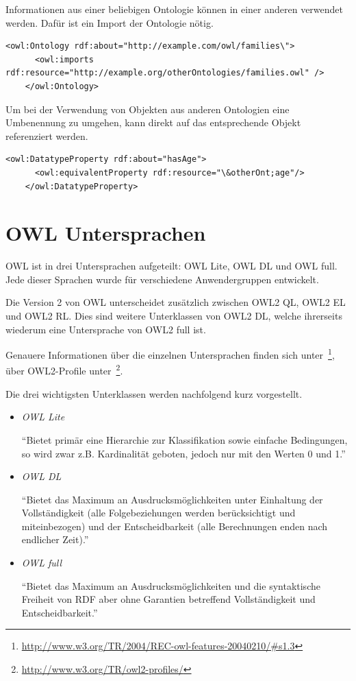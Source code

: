 Informationen aus einer beliebigen Ontologie können in einer anderen verwendet werden. Dafür ist ein Import der Ontologie nötig.

\begin{lstlisting}[caption={Beispiel eines Importes einer Ontologie}]
    <owl:Ontology rdf:about="http://example.com/owl/families\">
      <owl:imports rdf:resource="http://example.org/otherOntologies/families.owl" />
    </owl:Ontology>
\end{lstlisting}


Um bei der Verwendung von Objekten aus anderen Ontologien eine Umbenennung zu umgehen, kann direkt auf das entsprechende Objekt referenziert werden.

\begin{lstlisting}[caption={Beispiel einer Referenzierung auf ein Objekt einer externen Ontologie}]
    <owl:DatatypeProperty rdf:about="hasAge">
      <owl:equivalentProperty rdf:resource="\&otherOnt;age"/>
    </owl:DatatypeProperty>
\end{lstlisting}

\section{OWL Untersprachen}
\label{sec:owl_owl_Untersprachen}
OWL ist in drei Untersprachen aufgeteilt: OWL Lite, OWL DL und OWL full. Jede dieser Sprachen wurde für verschiedene Anwendergruppen entwickelt.

Die Version 2 von OWL unterscheidet zusätzlich zwischen OWL2 QL, OWL2 EL und OWL2 RL. Dies sind weitere Unterklassen von OWL2 DL, welche ihrerseits wiederum eine Untersprache von OWL2 full ist.

Genauere Informationen über die einzelnen Untersprachen finden sich unter~\footnote{\url{http://www.w3.org/TR/2004/REC-owl-features-20040210/\#s1.3}}, über OWL2-Profile unter~\footnote{\url{http://www.w3.org/TR/owl2-profiles/}}.

Die drei wichtigsten Unterklassen werden nachfolgend kurz vorgestellt.
\begin{itemize}
    \item \textit{OWL Lite}

        ``Bietet primär eine Hierarchie zur Klassifikation sowie einfache Bedingungen, so wird zwar z.B. 				Kardinalität geboten, jedoch nur mit den Werten 0 und 1.''~\cite[S. 12]{projekt2Doc}

    \item{\textit{OWL DL}}

        ``Bietet das Maximum an Ausdrucksmöglichkeiten unter Einhaltung der Vollständigkeit (alle Folgebeziehungen werden berücksichtigt und miteinbezogen) und der Entscheidbarkeit (alle Berechnungen enden nach endlicher Zeit).''~\cite[S. 12]{projekt2Doc}

    \item{\textit{OWL full}}

        ``Bietet das Maximum an Ausdrucksmöglichkeiten und die syntaktische Freiheit von RDF aber ohne Garantien betreffend Vollständigkeit und Entscheidbarkeit.''~\cite[S. 12]{projekt2Doc}

\end{itemize}

